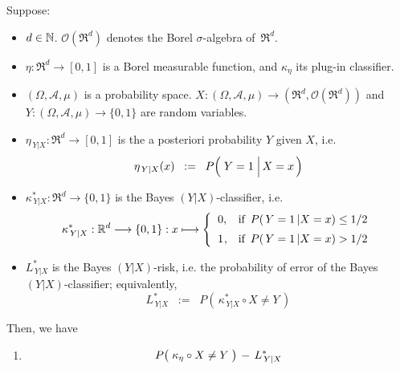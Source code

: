 
\vskip 0.5cm
\begin{theorem}
\mbox{}\vskip 0.1cm
\noindent
Suppose:
\begin{itemize}
\item
	$d \in \mathbb{N}$.
	$\mathcal{O}(\Re^{d})$ denotes the Borel $\sigma$-algebra of \,$\Re^{d}$.
\item
	$\eta : \Re^{d} \longrightarrow [0,1]$ is a Borel measurable function, and
	$\kappa_{\eta}$ its plug-in classifier.
\item
	$(\Omega,\mathcal{A},\mu)$ is a probability space.
	$X : (\Omega,\mathcal{A},\mu) \longrightarrow (\Re^{d},\mathcal{O}(\Re^{d}))$ and\,
	$Y : (\Omega,\mathcal{A},\mu) \longrightarrow \{0,1\}$
	are random variables.
\item
	$\eta_{\,Y \vert X } : \Re^{d} \longrightarrow [0,1]$ is the a posteriori probability $Y$ given $X$, i.e.
	\begin{equation*}
	\eta_{\,Y \vert X}(x) \;\; := \;\; P\!\left(\,\left. \overset{{\color{white}.}}{Y} = 1 \;\right\vert X = x \,\right)
	\end{equation*}
\item
	$\kappa^{*}_{\,Y \vert X} : \Re^{d} \longrightarrow \{0,1\}$ is the Bayes $(Y \vert X)$-classifier, i.e.
	\begin{equation*}
	\kappa^{*}_{\,Y \vert X} : \Re^{d} \longrightarrow \{0,1\} : x \longmapsto
		\left\{\begin{array}{cl}
			0, & \textnormal{if \,$P(\,Y=1 \,\vert X = x) \leq 1/2$}
			\\
			\overset{{\color{white}-}}{1}, & \textnormal{if \,$P(\,Y=1 \,\vert X = x) > 1/2$}
		\end{array}\right.
	\end{equation*}
\item
	$L^{*}_{\,Y \vert X}$ is the Bayes $(Y \vert X)$-risk,
	i.e. the probability of error of the Bayes $(Y \vert X)$-classifier;
	equivalently,
	\begin{equation*}
	L^{*}_{\,Y \vert X} \;\; := \;\; P\!\left(\, \kappa^{*}_{\,Y \vert X} \circ X \neq Y \,\right)
	\end{equation*}	
\end{itemize}
Then, we have
\begin{enumerate}
\item\label{boundOnProbabilityOrError}
	\begin{eqnarray*}
	P\!\left(\;\kappa_{\eta} \overset{{\color{white}.}}{\circ} X \neq Y \;\right) \,-\, L^{*}_{\,Y \vert X}

\end{eqnarray*}
\end{enumerate}
\end{theorem}
